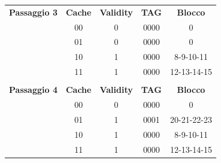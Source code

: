 \documentclass[12pt,a4paper]{article}
\begin{document}
\begin{minipage}{.45\linewidth}
\begin{center}
{\begin{tabular}{lcccc}
\multicolumn{1}{l|}{{\color[HTML]{3166FF} \textbf{Passaggio 3}}} & \multicolumn{1}{c|}{\textbf{Cache}} & \multicolumn{1}{c|}{\textbf{Validity}} & \multicolumn{1}{c|}{\textbf{TAG}} & \multicolumn{1}{c|}{\textbf{Blocco}} \\ \cline{2-5} 
\multicolumn{1}{l|}{{\color[HTML]{3166FF} }} & \multicolumn{1}{c|}{00} & \multicolumn{1}{c|}{0} & \multicolumn{1}{c|}{0000} & \multicolumn{1}{c|}{0} \\ \cline{2-5} 
\multicolumn{1}{l|}{{\color[HTML]{3166FF} }} & \multicolumn{1}{c|}{01} & \multicolumn{1}{c|}{0} & \multicolumn{1}{c|}{0000} & \multicolumn{1}{c|}{0} \\ \cline{2-5} 
\multicolumn{1}{l|}{{\color[HTML]{3166FF} }} & \multicolumn{1}{c|}{10} & \multicolumn{1}{c|}{1} & \multicolumn{1}{c|}{0000} & \multicolumn{1}{c|}{8-9-10-11} \\ \cline{2-5} 
\multicolumn{1}{l|}{{\color[HTML]{3166FF} }} & \multicolumn{1}{c|}{11} & \multicolumn{1}{c|}{1} & \multicolumn{1}{c|}{0000} & \multicolumn{1}{c|}{12-13-14-15} \\ \cline{2-5} 
{\color[HTML]{3166FF} } &  &  &  &  \\ \cline{2-5} 
\multicolumn{1}{l|}{{\color[HTML]{3166FF} \textbf{Passaggio 4}}} & \multicolumn{1}{c|}{\textbf{Cache}} & \multicolumn{1}{c|}{\textbf{Validity}} & \multicolumn{1}{c|}{\textbf{TAG}} & \multicolumn{1}{c|}{\textbf{Blocco}} \\ \cline{2-5} 
\multicolumn{1}{l|}{{\color[HTML]{3166FF} }} & \multicolumn{1}{c|}{00} & \multicolumn{1}{c|}{0} & \multicolumn{1}{c|}{0000} & \multicolumn{1}{c|}{0} \\ \cline{2-5} 
\multicolumn{1}{l|}{{\color[HTML]{3166FF} }} & \multicolumn{1}{c|}{01} & \multicolumn{1}{c|}{1} & \multicolumn{1}{c|}{0001} & \multicolumn{1}{c|}{20-21-22-23} \\ \cline{2-5} 
\multicolumn{1}{l|}{{\color[HTML]{3166FF} }} & \multicolumn{1}{c|}{10} & \multicolumn{1}{c|}{1} & \multicolumn{1}{c|}{0000} & \multicolumn{1}{c|}{8-9-10-11} \\ \cline{2-5} 
\multicolumn{1}{l|}{{\color[HTML]{3166FF} }} & \multicolumn{1}{c|}{11} & \multicolumn{1}{c|}{1} & \multicolumn{1}{c|}{0000} & \multicolumn{1}{c|}{12-13-14-15} \\ \cline{2-5} 
\end{tabular}%
}\end{center}
\end{minipage}
\end{document}

